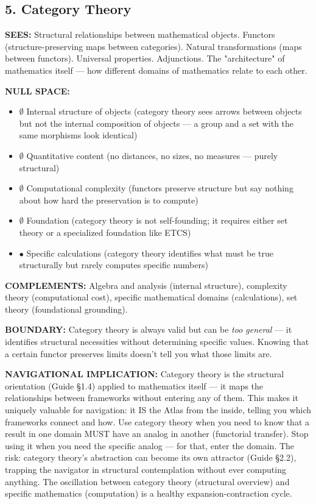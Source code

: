 \bigskip\noindent\makebox[\textwidth]{\color{rulegray}\rule{5cm}{0.3pt}}\bigskip


\subsection*{5. Category Theory}


\textbf{SEES:} Structural relationships between mathematical objects. Functors (structure-preserving maps between categories). Natural transformations (maps between functors). Universal properties. Adjunctions. The "architecture" of mathematics itself — how different domains of mathematics relate to each other.


\textbf{NULL SPACE:}

\begin{itemize}[nosep,leftmargin=*]
  \item $\emptyset$ Internal structure of objects (category theory sees arrows between objects but not the internal composition of objects — a group and a set with the same morphisms look identical)
  \item $\emptyset$ Quantitative content (no distances, no sizes, no measures — purely structural)
  \item $\emptyset$ Computational complexity (functors preserve structure but say nothing about how hard the preservation is to compute)
  \item $\emptyset$ Foundation (category theory is not self-founding; it requires either set theory or a specialized foundation like ETCS)
  \item $\bullet$ Specific calculations (category theory identifies what must be true structurally but rarely computes specific numbers)
\end{itemize}


\textbf{COMPLEMENTS:} Algebra and analysis (internal structure), complexity theory (computational cost), specific mathematical domains (calculations), set theory (foundational grounding).


\textbf{BOUNDARY:} Category theory is always valid but can be \textit{too general} — it identifies structural necessities without determining specific values. Knowing that a certain functor preserves limits doesn't tell you what those limits are.


\textbf{NAVIGATIONAL IMPLICATION:} Category theory is the structural orientation (Guide §1.4) applied to mathematics itself — it maps the relationships between frameworks without entering any of them. This makes it uniquely valuable for navigation: it IS the Atlas from the inside, telling you which frameworks connect and how. Use category theory when you need to know that a result in one domain MUST have an analog in another (functorial transfer). Stop using it when you need the specific analog — for that, enter the domain. The risk: category theory's abstraction can become its own attractor (Guide §2.2), trapping the navigator in structural contemplation without ever computing anything. The oscillation between category theory (structural overview) and specific mathematics (computation) is a healthy expansion-contraction cycle.


